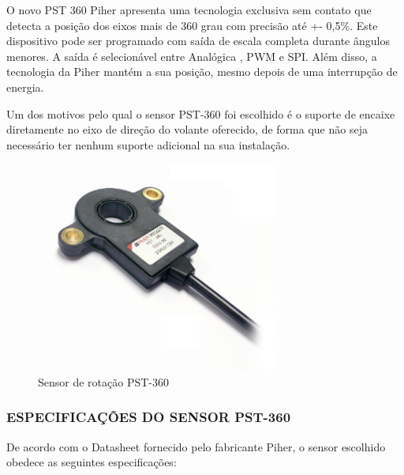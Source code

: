 O novo PST 360 Piher apresenta uma tecnologia exclusiva sem contato que detecta a posição dos
eixos mais de 360 grau com precisão até +- 0,5\%. Este dispositivo pode ser programado com
saída de escala completa durante ângulos menores. A saída é selecionável entre Analógica ,
PWM e SPI. Além disso, a tecnologia da Piher mantém a sua posição, mesmo depois de uma
interrupção de energia.

Um dos motivos pelo qual o sensor PST-360 foi escolhido é o suporte de encaixe diretamente no eixo de direção do volante oferecido, de forma que não seja necessário ter nenhum suporte adicional na sua instalação.

\begin{figure}[h]
  \centering
  \includegraphics[width=300px, scale=1]{figuras/pst}
  \caption{ Sensor de rotação PST-360}
\label{fig:pst}
\end{figure}

\subsubsection{ESPECIFICAÇÕES DO SENSOR PST-360}

De acordo com o Datasheet \cite{sensor_rotacao} fornecido pelo fabricante Piher, o sensor escolhido
obedece as seguintes especificações:


